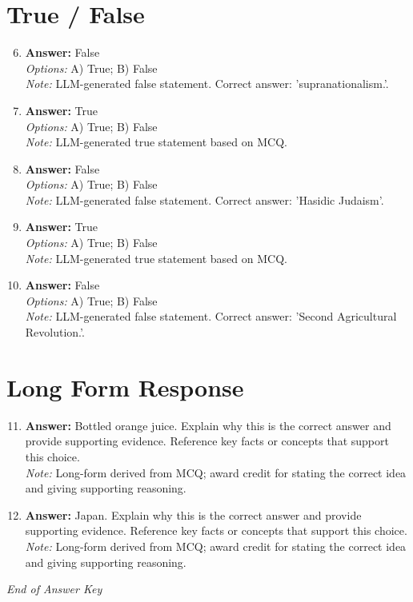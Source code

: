 \documentclass[12pt]{article}
\begin{document}
\section*{True / False}
\begin{enumerate}[label=\arabic*.]
\setcounter{enumi}{5}
\item \textbf{Answer:} False
\\ \textit{Options:} A) True; B) False
\\ \textit{Note:} LLM-generated false statement. Correct answer: 'supranationalism.'.
\item \textbf{Answer:} True
\\ \textit{Options:} A) True; B) False
\\ \textit{Note:} LLM-generated true statement based on MCQ.
\item \textbf{Answer:} False
\\ \textit{Options:} A) True; B) False
\\ \textit{Note:} LLM-generated false statement. Correct answer: 'Hasidic Judaism'.
\item \textbf{Answer:} True
\\ \textit{Options:} A) True; B) False
\\ \textit{Note:} LLM-generated true statement based on MCQ.
\item \textbf{Answer:} False
\\ \textit{Options:} A) True; B) False
\\ \textit{Note:} LLM-generated false statement. Correct answer: 'Second Agricultural Revolution.'.
\end{enumerate}

\section*{Long Form Response}
\begin{enumerate}[label=\arabic*.]
\setcounter{enumi}{10}
\item \textbf{Answer:} Bottled orange juice. Explain why this is the correct answer and provide supporting evidence. Reference key facts or concepts that support this choice.
\\ \textit{Note:} Long-form derived from MCQ; award credit for stating the correct idea and giving supporting reasoning.
\item \textbf{Answer:} Japan. Explain why this is the correct answer and provide supporting evidence. Reference key facts or concepts that support this choice.
\\ \textit{Note:} Long-form derived from MCQ; award credit for stating the correct idea and giving supporting reasoning.
\end{enumerate}

\vfill
\noindent\textit{End of Answer Key}
\end{document}
